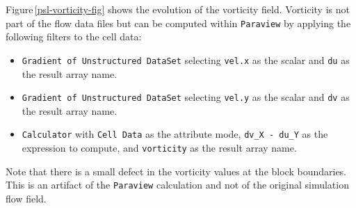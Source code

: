 \medskip
Figure\,\ref{psl-vorticity-fig} shows the evolution of the vorticity field.
Vorticity is not part of the flow data files but can be computed within \texttt{Paraview}
by applying the following filters to the cell data:
\begin{itemize}
 \item \texttt{Gradient of Unstructured DataSet} selecting \texttt{vel.x} as the scalar and
    \texttt{du} as the result array name.
 \item \texttt{Gradient of Unstructured DataSet} selecting \texttt{vel.y} as the scalar and
    \texttt{dv} as the result array name.
 \item \texttt{Calculator} with \texttt{Cell Data} as the attribute mode, 
    \texttt{dv\_X - du\_Y} as the expression to compute, and \texttt{vorticity} as the result array name.
\end{itemize}
Note that there is a small defect in the vorticity values at the block boundaries.
This is an artifact of the \texttt{Paraview} calculation and not of the original simulation flow field.
 

